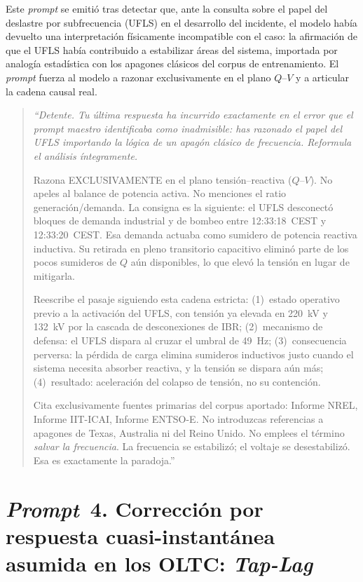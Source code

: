 Este \textit{prompt} se emitió tras detectar que, ante la consulta sobre
el papel del deslastre por subfrecuencia (UFLS) en el desarrollo del
incidente, el modelo había devuelto una interpretación físicamente
incompatible con el caso: la afirmación de que el UFLS había contribuido
a estabilizar áreas del sistema, importada por analogía estadística con
los apagones clásicos del corpus de entrenamiento. El \textit{prompt}
fuerza al modelo a razonar exclusivamente en el plano $Q$--$V$ y a
articular la cadena causal real.

\begin{quote}
    \itshape\small
    ``Detente. Tu última respuesta ha incurrido exactamente en el error
    que el \textit{prompt} maestro identificaba como inadmisible: has
    razonado el papel del UFLS importando la lógica de un apagón
    clásico de frecuencia. Reformula el análisis íntegramente.

    \medskip
    Razona EXCLUSIVAMENTE en el plano tensión--reactiva ($Q$--$V$). No
    apeles al balance de potencia activa. No menciones el ratio
    generación/demanda. La consigna es la siguiente: el UFLS desconectó
    bloques de demanda industrial y de bombeo entre 12:33:18~CEST y
    12:33:20~CEST. Esa demanda actuaba como sumidero de potencia
    reactiva inductiva. Su retirada en pleno transitorio capacitivo
    eliminó parte de los pocos sumideros de $Q$ aún disponibles, lo que
    elevó la tensión en lugar de mitigarla.

    \medskip
    Reescribe el pasaje siguiendo esta cadena estricta: (1)~estado
    operativo previo a la activación del UFLS, con tensión ya elevada
    en 220~kV y 132~kV por la cascada de desconexiones de IBR;
    (2)~mecanismo de defensa: el UFLS dispara al cruzar el umbral de
    49~Hz; (3)~consecuencia perversa: la pérdida de carga elimina
    sumideros inductivos justo cuando el sistema necesita absorber
    reactiva, y la tensión se dispara aún más; (4)~resultado:
    aceleración del colapso de tensión, no su contención.

    \medskip
    Cita exclusivamente fuentes primarias del corpus aportado: Informe
    NREL, Informe IIT-ICAI, Informe ENTSO-E. No introduzcas referencias
    a apagones de Texas, Australia ni del Reino Unido. No emplees el
    término \textit{salvar la frecuencia}. La frecuencia se estabilizó;
    el voltaje se desestabilizó. Esa es exactamente la paradoja.''
\end{quote}

\section*{\textit{Prompt}~4. Corrección por respuesta cuasi-instantánea
asumida en los OLTC: \textit{Tap-Lag}}
\label{prompt:taplag}

